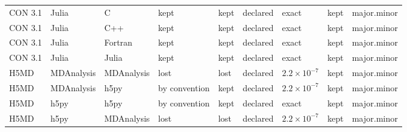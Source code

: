 \begin{table}[ht]
{\begin{tabular}{@{}lllllllll@{}}
CON 3.1 & Julia & C & kept & kept & declared & exact & kept & major.minor \\
CON 3.1 & Julia & C++ & kept & kept & declared & exact & kept & major.minor \\
CON 3.1 & Julia & Fortran & kept & kept & declared & exact & kept & major.minor \\
CON 3.1 & Julia & Julia & kept & kept & declared & exact & kept & major.minor \\
H5MD & MDAnalysis & MDAnalysis & lost & lost & declared & \(2.2\times10^{-7}\) & kept & major.minor \\
H5MD & MDAnalysis & h5py & by convention & kept & declared & \(2.2\times10^{-7}\) & kept & major.minor \\
H5MD & h5py & h5py & by convention & kept & declared & exact & kept & major.minor \\
H5MD & h5py & MDAnalysis & lost & lost & declared & \(2.2\times10^{-7}\) & kept & major.minor \\
\bottomrule
\end{tabular}}
\end{table}
